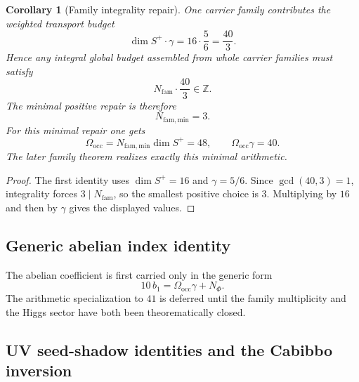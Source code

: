\documentclass[11pt,a4paper]{article}
\newtheorem{corollary}[theorem]{Corollary}
\theoremstyle{definition}
\theoremstyle{remark}
\newcommand{\bone}{b_1}
\begin{document}
\begin{corollary}[Family integrality repair]
\label{cor:family-integrality-repair}
One carrier family contributes the weighted transport budget
\[
\dim S^+\cdot\gamma
=
16\cdot\frac56
=
\frac{40}{3}.
\]
Hence any integral global budget assembled from whole carrier families must satisfy
\[
N_{\mathrm{fam}}\cdot \frac{40}{3}\in\mathbb Z.
\]
The minimal positive repair is therefore
\[
N_{\mathrm{fam,min}}=3.
\]
For this minimal repair one gets
\[
\Omega_{\mathrm{occ}}=N_{\mathrm{fam,min}}\dim S^+=48,
\qquad
\Omega_{\mathrm{occ}}\gamma=40.
\]
The later family theorem realizes exactly this minimal arithmetic.
\end{corollary}

\begin{proof}
The first identity uses $\dim S^+=16$ and $\gamma=5/6$. Since $\gcd(40,3)=1$, integrality forces
$3\mid N_{\mathrm{fam}}$, so the smallest positive choice is $3$. Multiplying by $16$ and then by
$\gamma$ gives the displayed values.
\end{proof}

\subsection{Generic abelian index identity}

The abelian coefficient is first carried only in the generic form
\begin{equation}
\label{eq:41-chain-main}
10\,\bone
=
\Omega_{\mathrm{occ}}\gamma+N_\Phi.
\end{equation}
The arithmetic specialization to $41$ is deferred until the family multiplicity and the Higgs
sector have both been theorematically closed.

\subsection{UV seed-shadow identities and the Cabibbo inversion}
\end{document}
